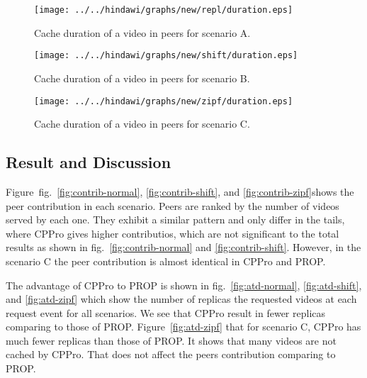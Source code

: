 \begin{figure}[!t]
\begin{center}
\texttt{[image: ../../hindawi/graphs/new/repl/duration.eps]}
\end{center}
\caption{Cache duration of a video in peers for scenario A.}
\label{fig:duration-normal}
\end{figure}

\begin{figure}[!t]
\begin{center}
\texttt{[image: ../../hindawi/graphs/new/shift/duration.eps]}
\end{center}
\caption{Cache duration of a video in peers for scenario B.}
\label{fig:duration-shift}
\end{figure}

\begin{figure}[!t]
\begin{center}
\texttt{[image: ../../hindawi/graphs/new/zipf/duration.eps]}
\end{center}
\caption{Cache duration of a video in peers for scenario C.}
\label{fig:duration-zipf}
\end{figure}


\subsection{Result and Discussion}\label{resultanddiscussion}

Figure~fig.~\ref{fig:contrib-normal}, \ref{fig:contrib-shift}, and \ref{fig:contrib-zipf}shows the peer contribution in each scenario.
Peers are ranked by the number of videos served by each one.
They exhibit a similar pattern and only differ in the tails, where CPPro gives higher contributios, which are not significant to the total results as shown in fig.~\ref{fig:contrib-normal} and \ref{fig:contrib-shift}.
However, in the scenario C the peer contribution is almost identical in CPPro and PROP. 

The advantage of CPPro to PROP is shown in fig.~\ref{fig:atd-normal}, \ref{fig:atd-shift}, and \ref{fig:atd-zipf}  which show the number of replicas the requested videos at each request event for all scenarios.
We see that CPPro result in fewer replicas comparing to those of PROP.
Figure~\ref{fig:atd-zipf} that for scenario C,  CPPro has much fewer replicas than those of PROP.
It shows that many videos are not cached by CPPro.
That does not affect the peers contribution comparing to PROP.


